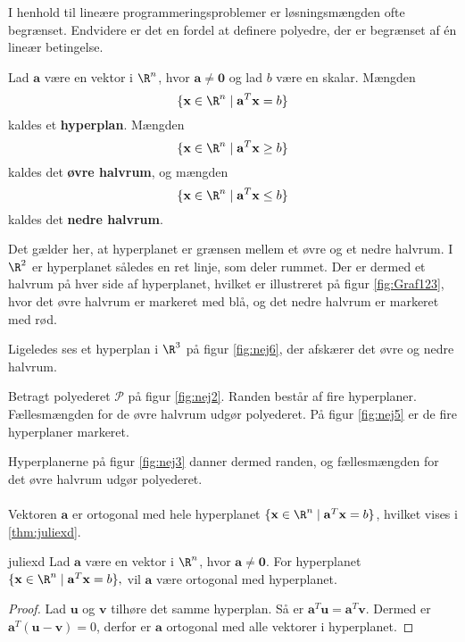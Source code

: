 % 
%
%
I henhold til lineære programmeringsproblemer er løsningsmængden ofte begrænset.
Endvidere er det en fordel at definere polyedre, der er begrænset af én lineær betingelse. 
%
\begin{defn}{}{}
Lad $\mathbf{a}$ være en vektor i $\R^n$, hvor $\mathbf{a} \neq \mathbf{0}$ og lad $b$ være en skalar.
Mængden $$\{\textbf{x} \in \R^n \mid \mathbf{a}^T \mathbf{x}=b\}$$ kaldes et \textbf{hyperplan}.
%
Mængden $$\{\textbf{x} \in \R^n \mid \mathbf{a}^T \mathbf{x} \geq b\}$$ kaldes det \textbf{øvre halvrum}, og
mængden $$\{\textbf{x} \in \R^n \mid \mathbf{a}^T \mathbf{x} \leq b\}$$ kaldes det \textbf{nedre halvrum}.
\end{defn}
\noindent
%
Det gælder her, at hyperplanet er grænsen mellem et øvre og et nedre halvrum.
I $\R^2$ er hyperplanet således en ret linje, som deler rummet. 
Der er dermed et halvrum på hver side af hyperplanet, hvilket er illustreret på figur \ref{fig:Graf123}, hvor det øvre halvrum er markeret med blå, og det nedre halvrum er markeret med rød. 
%
%

%
Ligeledes ses et hyperplan i $\R^3$ på figur \ref{fig:nej6}, der afskærer det øvre og nedre halvrum.
%
%

%
Betragt polyederet $\mathcal{P}$ på figur \ref{fig:nej2}. 
Randen består af fire hyperplaner.
Fællesmængden for de øvre halvrum udgør polyederet.
På figur \ref{fig:nej5} er de fire hyperplaner markeret. 
%
%

%
Hyperplanerne på figur \ref{fig:nej3} danner dermed randen, og fællesmængden for det øvre halvrum udgør polyederet.
\\\\
%
%
%
Vektoren $\textbf{a}$ er ortogonal med hele hyperplanet $\{\textbf{x} \in \R^n \mid \mathbf{a}^T \mathbf{x}=b\}$, hvilket vises i \ref{thm:juliexd}. 
%
\begin{thm}{}{juliexd}
Lad $\mathbf{a}$ være en vektor i $\R^n$, hvor 
$\mathbf{a} \neq \mathbf{0}.$
For hyperplanet 
$\{\textbf{x} \in \R^n \mid \mathbf{a}^T \mathbf{x}=b\},$ 
vil $\mathbf{a}$ være ortogonal med hyperplanet.
\end{thm}
%
\begin{proof}
Lad $\mathbf{u}$ og $\mathbf{v}$ tilhøre det samme hyperplan. 
Så er $\mathbf{a}^T\textbf{u}=\mathbf{a}^T\textbf{v}.$
Dermed er $\mathbf{a}^T(\textbf{u}-\textbf{v})=0$, derfor er $\mathbf{a}$ ortogonal med alle vektorer i hyperplanet. 
\end{proof}